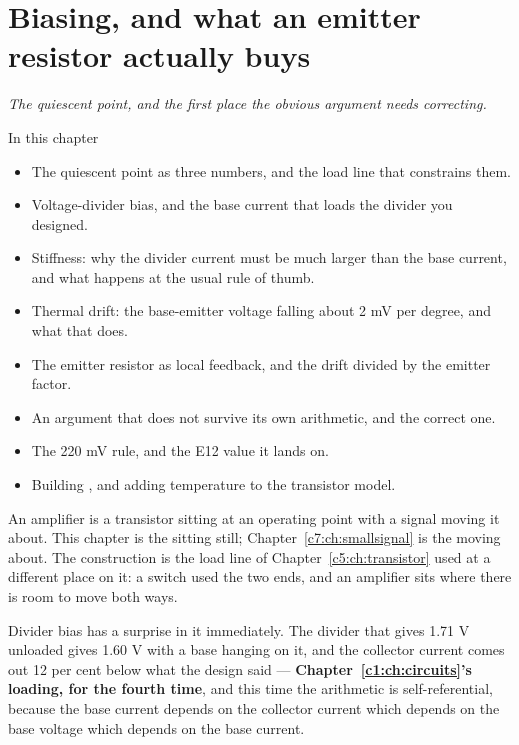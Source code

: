 
\chapter{Biasing, and what an emitter resistor actually buys}
\label{c6:ch:bias}

{\large\itshape The quiescent point, and the first place the obvious argument needs correcting.\par}

\begin{chapterbox}{In this chapter}
\begin{itemize}
  \item The quiescent point as three numbers, and the load line that constrains them.
  \item Voltage-divider bias, and the base current that loads the divider you designed.
  \item Stiffness: why the divider current must be much larger than the base current, and what
    happens at the usual rule of thumb.
  \item Thermal drift: the base-emitter voltage falling about 2 mV per degree, and what that does.
  \item The emitter resistor as local feedback, and the drift divided by the emitter factor.
  \item An argument that does not survive its own arithmetic, and the correct one.
  \item The 220 mV rule, and the E12 value it lands on.
  \item Building , and adding temperature to the transistor model.
\end{itemize}
\end{chapterbox}

An amplifier is a transistor sitting at an operating point with a signal moving it about. This
chapter is the sitting still; Chapter~\ref{c7:ch:smallsignal} is the moving about. The
construction is the load line of Chapter~\ref{c5:ch:transistor} used at a different place on it: a
switch used the two ends, and an amplifier sits where there is room to move both ways.

Divider bias has a surprise in it immediately. The divider that gives 1.71 V unloaded gives 1.60 V
with a base hanging on it, and the collector current comes out 12 per cent below what the design
said --- \textbf{Chapter~\ref{c1:ch:circuits}'s loading, for the fourth time}, and this time the
arithmetic is self-referential, because the base current depends on the collector current which
depends on the base voltage which depends on the base current.


